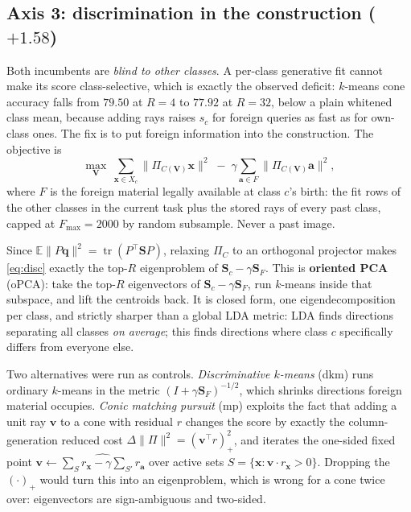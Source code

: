 \documentclass[10pt,twocolumn]{article}
\newcommand{\bx}{\mathbf{x}}
\newcommand{\bq}{\mathbf{q}}
\newcommand{\bv}{\mathbf{v}}
\newcommand{\bV}{\mathbf{V}}
\newcommand{\bS}{\mathbf{S}}
\begin{document}
\subsection{Axis 3: discrimination in the construction ($+1.58$)}
\label{sec:opca}

Both incumbents are \emph{blind to other classes}. A per-class generative fit
cannot make its score class-selective, which is exactly the observed deficit:
$k$-means cone accuracy falls from $79.50$ at $R{=}4$ to $77.92$ at $R{=}32$,
below a plain whitened class mean, because adding rays raises $s_c$ for foreign
queries as fast as for own-class ones. The fix is to put foreign information
into the construction. The objective is
\begin{equation}
\max_{\bV}\ \sum_{\bx\in X_c}\lVert\Pi_{C(\bV)}\bx\rVert^2
\;-\;\gamma\sum_{\mathbf{a}\in F}\lVert\Pi_{C(\bV)}\mathbf{a}\rVert^2 ,
\label{eq:disc}
\end{equation}
where $F$ is the foreign material legally available at class $c$'s birth: the
fit rows of the other classes in the current task plus the stored rays of every
past class, capped at $F_{\max}{=}2000$ by random subsample. Never a past image.

Since $\mathbb{E}\lVert P\bq\rVert^2=\operatorname{tr}(P^{\!\top}\bS P)$,
relaxing $\Pi_C$ to an orthogonal projector makes \eqref{eq:disc} exactly the
top-$R$ eigenproblem of $\bS_c-\gamma\bS_F$. This is \textbf{oriented PCA}
(oPCA): take the top-$R$ eigenvectors of $\bS_c-\gamma\bS_F$, run $k$-means
inside that subspace, and lift the centroids back. It is closed form, one
eigendecomposition per class, and strictly sharper than a global LDA metric:
LDA finds directions separating all classes \emph{on average}; this finds
directions where class $c$ specifically differs from everyone else.

Two alternatives were run as controls. \emph{Discriminative $k$-means} (dkm)
runs ordinary $k$-means in the metric $(I+\gamma\bS_F)^{-1/2}$, which shrinks
directions foreign material occupies. \emph{Conic matching pursuit} (mp)
exploits the fact that adding a unit ray $\bv$ to a cone with residual $r$
changes the score by exactly the column-generation reduced cost
$\Delta\lVert\Pi\rVert^2=(\bv^{\!\top}r)_+^2$, and iterates the one-sided fixed
point $\bv\leftarrow\widehat{\sum_{S}r_\bx-\gamma\sum_{S'}r_\mathbf{a}}$ over
active sets $S=\{\bx:\bv\cdot r_\bx>0\}$. Dropping the $(\cdot)_+$ would turn
this into an eigenproblem, which is wrong for a cone twice over: eigenvectors
are sign-ambiguous and two-sided.
\end{document}
